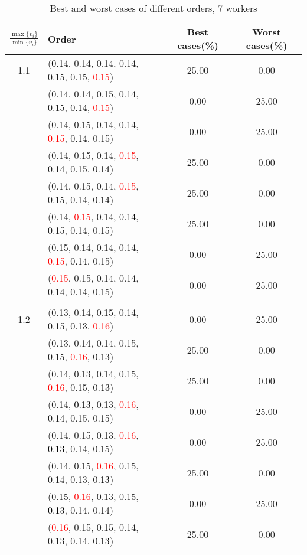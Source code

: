 \documentclass[10pt,a4paper]{report}
\begin{document}
\newpage\begin{center}
	\small
	\begin{longtable}{clcc}
		\caption{Best and worst cases of different orders, 7 workers}\\
		\toprule
		\setlength{\tabcolsep}{1mm}
		\renewcommand\baselinestretch{0.5}\selectfont
		$\frac{\max\{v_i\}}{\min\{v_i\}}$ & Order & Best cases(\%) & Worst cases(\%) \\
			\midrule		1.1			&(\textcolor{black}{0.14}, 0.14, 0.14, 0.14, 0.15, 0.15, \textcolor{red}{0.15})&25.00&0.00\\
			&(0.14, 0.14, 0.15, 0.14, 0.15, \textcolor{black}{0.14}, \textcolor{red}{0.15})&0.00&25.00\\
			&(0.14, 0.15, 0.14, 0.14, \textcolor{red}{0.15}, \textcolor{black}{0.14}, 0.15)&0.00&25.00\\
			&(0.14, 0.15, 0.14, \textcolor{red}{0.15}, 0.14, 0.15, \textcolor{black}{0.14})&25.00&0.00\\
			&(0.14, 0.15, 0.14, \textcolor{red}{0.15}, 0.15, 0.14, \textcolor{black}{0.14})&25.00&0.00\\
			&(0.14, \textcolor{red}{0.15}, 0.14, \textcolor{black}{0.14}, 0.15, 0.14, 0.15)&25.00&0.00\\
			&(0.15, 0.14, 0.14, 0.14, \textcolor{red}{0.15}, \textcolor{black}{0.14}, 0.15)&0.00&25.00\\
			&(\textcolor{red}{0.15}, 0.15, 0.14, 0.14, 0.14, \textcolor{black}{0.14}, 0.15)&0.00&25.00\\
		&&&\\
		1.2			&(0.13, 0.14, 0.15, 0.14, 0.15, \textcolor{black}{0.13}, \textcolor{red}{0.16})&0.00&25.00\\
			&(0.13, 0.14, 0.14, 0.15, 0.15, \textcolor{red}{0.16}, \textcolor{black}{0.13})&25.00&0.00\\
			&(0.14, 0.13, 0.14, 0.15, \textcolor{red}{0.16}, 0.15, \textcolor{black}{0.13})&25.00&0.00\\
			&(0.14, \textcolor{black}{0.13}, 0.13, \textcolor{red}{0.16}, 0.14, 0.15, 0.15)&0.00&25.00\\
			&(0.14, 0.15, 0.13, \textcolor{red}{0.16}, \textcolor{black}{0.13}, 0.14, 0.15)&0.00&25.00\\
			&(0.14, 0.15, \textcolor{red}{0.16}, 0.15, 0.14, 0.13, \textcolor{black}{0.13})&25.00&0.00\\
			&(0.15, \textcolor{red}{0.16}, 0.13, 0.15, \textcolor{black}{0.13}, 0.14, 0.14)&0.00&25.00\\
			&(\textcolor{red}{0.16}, 0.15, 0.15, 0.14, 0.13, 0.14, \textcolor{black}{0.13})&25.00&0.00\\

\end{longtable}
\end{center}
\end{document}

